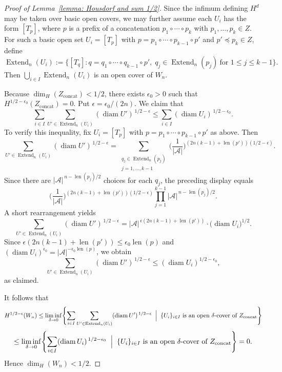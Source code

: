 \documentclass[10pt,a4paper]{amsart}
\begin{document}
\begin{proof}[Proof of Lemma~\ref{lemma: Housdorf and sum 1/2}]
Since the infimum defining \(H^d\) may be taken over basic open covers, we may further assume each \(U_i\) has the form \([T_p]\), where \(p\) is a prefix of a concatenation \(p_1\circ\cdots\circ p_k\) with \(p_1,\dots,p_k\in Z\). For such a basic open set \(U_i=[T_p]\) with
\(p=p_1\circ\cdots\circ p_{k-1}\circ p'\) and \(p'\preceq p_k\in Z\), define
\[
\operatorname{Extend}_n(U_i)
:=\bigl\{[T_q]:
q=q_1\circ\cdots\circ q_{k-1}\circ p',\;
q_j\in\operatorname{Extend}_n(p_j)\ \text{for }1\le j\le k-1\bigr\}.
\]
Then \(\bigcup_{i\in I}\operatorname{Extend}_n(U_i)\) is an open cover of \(W_n\).

Because \(\dim_H(Z_{\mathrm{concat}})<1/2\), there exists \(\epsilon_0>0\) such that \(H^{1/2-\epsilon_0}(Z_{\mathrm{concat}})=0\). Put \(\epsilon=\epsilon_0/(2n)\). We claim that
\[
\sum_{i\in I}\sum_{U'\in\operatorname{Extend}_n(U_i)}(\operatorname{diam} U')^{\,1/2-\epsilon}
\le
\sum_{i\in I}(\operatorname{diam} U_i)^{\,1/2-\epsilon_0}.
\]
To verify this inequality, fix \(U_i=[T_p]\) with
\(p=p_1\circ\cdots\circ p_{k-1}\circ p'\) as above. Then
\[
\sum_{U'\in\operatorname{Extend}_n(U_i)}(\operatorname{diam} U')^{\,1/2-\epsilon}
=
\sum_{\substack{q_j\in\operatorname{Extend}_n(p_j)\\ j=1,\dots,k-1}}
\biggl(\frac{1}{|\mathcal A|}\biggr)^{(2n(k-1)+\operatorname{len}(p'))(1/2-\epsilon)}.
\]
Since there are \(|\mathcal A|^{\,n-\operatorname{len}(p_j)/2}\) choices for each \(q_j\), the preceding display equals
\[
\biggl(\frac{1}{|\mathcal A|}\biggr)^{(2n(k-1)+\operatorname{len}(p'))(1/2-\epsilon)}
\prod_{j=1}^{k-1} |\mathcal A|^{\,n-\operatorname{len}(p_j)/2}.
\]
A short rearrangement yields
\[
\sum_{U'\in\operatorname{Extend}_n(U_i)}(\operatorname{diam} U')^{\,1/2-\epsilon}
=
|\mathcal A|^{\,\epsilon(2n(k-1)+\operatorname{len}(p'))}\cdot
\bigl(\operatorname{diam} U_i\bigr)^{1/2}.
\]
Since \(\epsilon(2n(k-1)+\operatorname{len}(p'))\le \epsilon_0\operatorname{len}(p)\) and \((\operatorname{diam} U_i)^{\epsilon_0} =  |\mathcal{A}|^{-\epsilon_0 \operatorname{len}(p)} \), we obtain
\[
\sum_{U'\in\operatorname{Extend}_n(U_i)}(\operatorname{diam} U')^{\,1/2-\epsilon}
\le (\operatorname{diam} U_i)^{1/2-\epsilon_0},
\]
as claimed.

It follows that
\[
H^{1/2-\epsilon}(W_n)
\le
\liminf_{\delta\to 0}
\Biggl\{
\sum_{i\in I}\sum_{U'\in\operatorname{Extend}_n(U_i)}(\operatorname{diam} U')^{\,1/2-\epsilon}
\;\Bigm|\;
\{U_i\}_{i\in I}\ \text{is an open }\delta\text{-cover of }Z_{\mathrm{concat}}
\Biggr\}
\]
\[
\le
\liminf_{\delta\to 0}
\Biggl\{
\sum_{i\in I}(\operatorname{diam} U_i)^{\,1/2-\epsilon_0}
\;\Bigm|\;
\{U_i\}_{i\in I}\ \text{is an open }\delta\text{-cover of }Z_{\mathrm{concat}}
\Biggr\}
=0.
\]
Hence \(\dim_H(W_n)<1/2\).


\end{proof}
\end{document}
